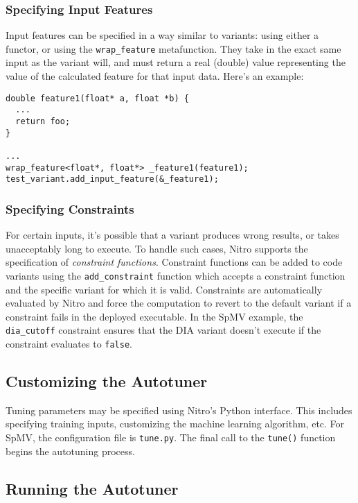 \documentclass[12pt]{article}
\begin{document}
\subsubsection{Specifying Input Features}
Input features can be specified in a way similar to variants: using either a functor, or
using the \texttt{wrap\_feature} metafunction. They take in the exact same input as the
variant will, and must return a real (double) value representing the value of the calculated
feature for that input data. Here's an example:

\begin{verbatim}
double feature1(float* a, float *b) {
  ...
  return foo;
}

...
wrap_feature<float*, float*> _feature1(feature1);
test_variant.add_input_feature(&_feature1);
\end{verbatim}

\subsubsection{Specifying Constraints}

For certain inputs, it's possible that a variant produces wrong results, or takes
unacceptably long to execute. To handle such cases, Nitro supports the specification
of \emph{constraint functions}.
Constraint functions can be added to code variants using the
\texttt{add\_constraint} function which accepts a constraint function and the specific variant for which it is valid.
Constraints are automatically evaluated by Nitro and force the computation to revert to
the default variant if a constraint fails in the deployed executable.
In the SpMV example, the \texttt{dia\_cutoff} constraint ensures that
the DIA variant doesn't execute if the constraint evaluates to \texttt{false}.

\subsection{Customizing the Autotuner}
\label{sec:tunepy}

Tuning parameters may be specified using Nitro's Python interface. This includes
specifying training inputs, customizing the machine learning algorithm, etc.
For SpMV, the configuration file is \texttt{tune.py}. The final call to
the \texttt{tune()} function begins the autotuning process.

\subsection{Running the Autotuner}
\end{document}
